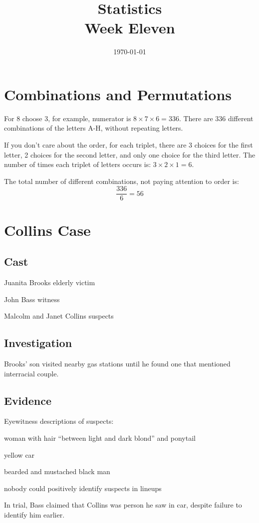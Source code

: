 \documentclass[landscape]{exam}
\title{Statistics \\ Week Eleven}
\date{\today}
\author{}
\begin{document}
  \maketitle
  \tableofcontents

  \section{Combinations and Permutations}

  For 8 choose 3, for example, numerator is $8 \times 7 \times 6 = 336$.
  There are 336 different combinations of the letters A-H, without
  repeating letters.

  If you don't care about the order, for each triplet, there are 3 choices for
  the first letter, 2 choices for the second letter, and only one choice for the
  third letter. The number of times each triplet of letters occurs is: 
  $3 \times 2 \times 1 = 6$.

  The total number of different combinations, not paying attention to order is:
  \[
    \frac{336}{6} = 56
  \]

  \section{Collins Case}

  \subsection{Cast}
  \begin{description*}
    \item[Juanita Brooks] elderly victim
    \item[John Bass] witness
    \item[Malcolm and Janet Collins] suspects
  \end{description*}

  \subsection{Investigation}
  Brooks' son visited nearby gas stations until he found one that mentioned
  interracial couple.

  \subsection{Evidence}
  Eyewitness descriptions of suspects:
  \begin{itemize*}
    \item woman with hair ``between light and dark blond'' and ponytail
    \item yellow car
    \item bearded and mustached black man
    \item nobody could positively identify suspects in lineups
    \item In trial, Bass claimed that Collins was person he saw in car, despite
      failure to identify him earlier.
  \end{itemize*}
\end{document}
